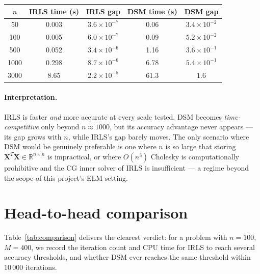 \begin{center}
\begin{tabular}{ccccc}
\toprule
$n$ & IRLS time (s) & IRLS gap & DSM time (s) & DSM gap \\
\midrule
50   & 0.003 & $3.6 \times 10^{-7}$ & 0.06  & $3.4 \times 10^{-2}$ \\
100  & 0.005 & $6.0 \times 10^{-7}$ & 0.09  & $5.2 \times 10^{-2}$ \\
500  & 0.052 & $3.4 \times 10^{-6}$ & 1.16  & $3.6 \times 10^{-1}$ \\
1000 & 0.298 & $8.7 \times 10^{-6}$ & 6.78  & $5.4 \times 10^{-1}$ \\
3000 & 8.65  & $2.2 \times 10^{-5}$ & 61.3  & $1.6$ \\
\bottomrule
\end{tabular}
\end{center}

\paragraph{Interpretation.}
IRLS is faster \emph{and} more accurate at every scale tested.
DSM becomes \emph{time-competitive} only beyond $n \approx 1000$, but
its accuracy advantage never appears — its gap grows with $n$, while IRLS's gap
barely moves.
The only scenario where DSM would be genuinely preferable is one where
$n$ is so large that storing $\mathbf{X}^T\mathbf{X} \in \mathbb{R}^{n \times n}$
is impractical, or where $O(n^3)$ Cholesky is computationally prohibitive and
the CG inner solver of IRLS is insufficient — a regime beyond the scope of
this project's ELM setting.

\section{Head-to-head comparison}
\label{sec:results_comparison}

Table~\ref{tab:comparison} delivers the clearest verdict: for a problem with
$n = 100$, $M = 400$, we record the iteration count and CPU time for IRLS
to reach several accuracy thresholds, and whether DSM ever reaches the same
threshold within 10\,000 iterations.

